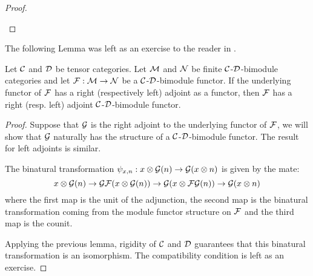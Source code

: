 \documentclass{amsart}
\begin{document}
\begin{proof}
\begin{center}
\end{center}
\end{proof}

The following Lemma was left as an exercise to the reader in \cite[\S 3.3]{EO-ftc}.

\begin{lemma} \label{lma:module-adjoint}
Let $\mathcal C$ and $\mathcal D$ be tensor categories. Let  $\mathcal M$ and  $\mathcal N$  be finite $\mathcal C$-$\mathcal D$-bimodule categories and let $\mathcal F: \mathcal M \to \mathcal N$ be a $\mathcal C$-$\mathcal D$-bimodule functor.  If the underlying functor of $\mathcal F$ has a right (respectively left) adjoint as a functor, then $\mathcal F$ has a right (resp. left) adjoint $\mathcal C$-$\mathcal D$-bimodule functor. 
\end{lemma}
\begin{proof}
Suppose that $\mathcal G$ is the right adjoint to the underlying functor of $\mathcal F$, we will show that $\mathcal G$ naturally has the structure of a $\mathcal C$-$\mathcal D$-bimodule functor.  The result for left adjoints is similar.

The binatural transformation $\psi_{x,n}: x \otimes \mathcal G(n) \rightarrow \mathcal G(x \otimes n)$ is given by the mate:
$$x \otimes \mathcal G(n) \rightarrow \mathcal G \mathcal F(x \otimes \mathcal G(n)) \rightarrow \mathcal G(x \otimes \mathcal F\mathcal G(n)) \rightarrow \mathcal G(x \otimes n)$$
where the first map is the unit of the adjunction, the second map is the binatural transformation coming from the module functor structure on $\mathcal F$ and the third map is the counit.  
\begin{center}
\end{center}

Applying the previous lemma, rigidity of $\mathcal C$ and $\mathcal D$ guarantees that this binatural transformation is an isomorphism.  The compatibility condition is left as an exercise.
\end{proof}
\end{document}
